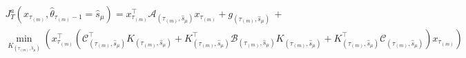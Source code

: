 \documentclass[journal,twoside,web]{ieeecolor}
\begin{document}
\begin{figure*}[ht]
\raggedright
\begin{align}\label{eq:cost-tau2}
\begin{aligned}
 & J_{T}^{a}(x_{\tau_{(m)}},\hat{\theta}_{\tau_{(m)}-1}=\hat{s}_{\mu}) = 
    x_{\tau_{(m)}}^{\top}\mathcal{A}_{(\tau_{(m)},\hat{s}_{\mu})}x_{\tau_{(m)}}^{} \!+ g_{(\tau_{(m)},\hat{s}_{\mu})} \,+ \\
    & \min_{K_{(\tau_{(m)},\hat{s}_{\mu})}} \left(\! x_{\tau_{(m)}}^{\top} \left( 
    \mathcal{C}_{(\tau_{(m)},\hat{s}_{\mu})}^{\top} K_{(\tau_{(m)},\hat{s}_{\mu})} + K_{(\tau_{(m)},\hat{s}_{\mu})}^{\top} \mathcal{B}_{(\tau_{(m)},\hat{s}_{\mu})} K_{(\tau_{(m)},\hat{s}_{\mu})}^{} + 
    K_{(\tau_{(m)},\hat{s}_{\mu})}^{\top}\mathcal{C}_{(\tau_{(m)},\hat{s}_{\mu})}^{} \right) x_{\tau_{(m)}} \right)
\end{aligned}
\end{align}
\end{figure*}
\end{document}
